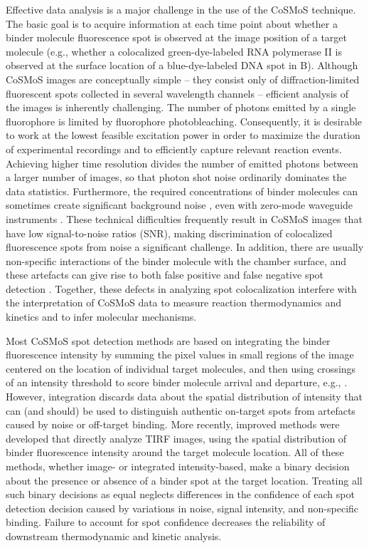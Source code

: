 Effective data analysis is a major challenge in the use of the CoSMoS technique. The basic goal is to acquire information at each time point about whether a binder molecule fluorescence spot is observed at the image position of a target molecule (e.g., whether a colocalized green-dye-labeled RNA polymerase II is observed at the surface location of a blue-dye-labeled DNA spot in B). Although CoSMoS images are conceptually simple -- they consist only of diffraction-limited fluorescent spots collected in several wavelength channels -- efficient analysis of the images is inherently challenging. The number of photons emitted by a single fluorophore is limited by fluorophore photobleaching. Consequently, it is desirable to work at the lowest feasible excitation power in order to maximize the duration of experimental recordings and to efficiently capture relevant reaction events. Achieving higher time resolution divides the number of emitted photons between a larger number of images, so that photon shot noise ordinarily dominates the data statistics. Furthermore, the required concentrations of binder molecules can sometimes create significant background noise \citep{Peng2018-ge, Van_Oijen2011-ig}, even with zero-mode waveguide instruments \citep{Chen2014-jd}. These technical difficulties frequently result in CoSMoS images that have low signal-to-noise ratios (SNR), making discrimination of colocalized fluorescence spots from noise a significant challenge. In addition, there are usually non-specific interactions of the binder molecule with the chamber surface, and these artefacts can give rise to both false positive and false negative spot detection \citep{Friedman2015-nx}. Together, these defects in analyzing spot colocalization interfere with the interpretation of CoSMoS data to measure reaction thermodynamics and kinetics and to infer molecular mechanisms.

Most CoSMoS spot detection methods are based on integrating the binder fluorescence intensity by summing the pixel values in small regions of the image centered on the location of individual target molecules, and then using crossings of an intensity threshold to score binder molecule arrival and departure, e.g., \citep{Friedman2012-if,Shcherbakova2013-bi}. However, integration discards data about the spatial distribution of intensity that can (and should) be used to distinguish authentic on-target spots from artefacts caused by noise or off-target binding.  More recently, improved methods \citep{Friedman2015-nx,Smith2019-yb} were developed that directly analyze TIRF images, using the spatial distribution of binder fluorescence intensity around the target molecule location. All of these methods, whether image- or integrated intensity-based, make a binary decision about the presence or absence of a binder spot at the target location.  Treating all such binary decisions as equal neglects differences in the confidence of each spot detection decision caused by variations in noise, signal intensity, and non-specific binding.  Failure to account for spot confidence decreases the reliability of downstream thermodynamic and kinetic analysis.

